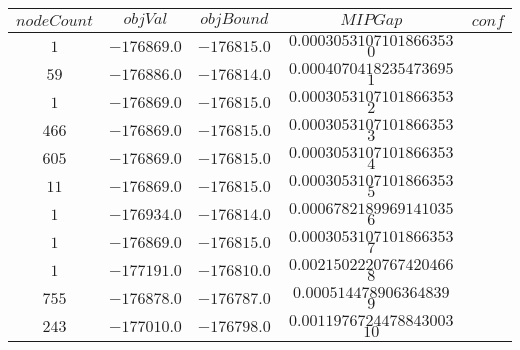\begin{center}
\begin{tabular}{|c|c|c|c|c|}
\hline
$nodeCount$ & $objVal$ & $objBound$ & $MIPGap$ & $conf$\\\hline
$1$ & $-176869.0$ & $-176815.0$ & $0.0003053107101866353$ $0$ \\\hline
$59$ & $-176886.0$ & $-176814.0$ & $0.0004070418235473695$ $1$ \\\hline
$1$ & $-176869.0$ & $-176815.0$ & $0.0003053107101866353$ $2$ \\\hline
$466$ & $-176869.0$ & $-176815.0$ & $0.0003053107101866353$ $3$ \\\hline
$605$ & $-176869.0$ & $-176815.0$ & $0.0003053107101866353$ $4$ \\\hline
$11$ & $-176869.0$ & $-176815.0$ & $0.0003053107101866353$ $5$ \\\hline
$1$ & $-176934.0$ & $-176814.0$ & $0.0006782189969141035$ $6$ \\\hline
$1$ & $-176869.0$ & $-176815.0$ & $0.0003053107101866353$ $7$ \\\hline
$1$ & $-177191.0$ & $-176810.0$ & $0.0021502220767420466$ $8$ \\\hline
$755$ & $-176878.0$ & $-176787.0$ & $0.000514478906364839$ $9$ \\\hline
$243$ & $-177010.0$ & $-176798.0$ & $0.0011976724478843003$ $10$ \\\hline
\end{tabular}
\end{center}
